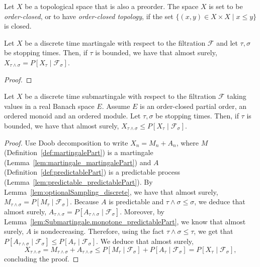 \begin{definition}\label{def:orderClosedTopology}
  \mathlibok
Let $X$ be a topological space that is also a preorder. The space $X$ is set to be \emph{order-closed}, or to have \emph{order-closed topology}, if the set $\{(x, y) \in X \times X \mid x \le y\}$ is closed.
\end{definition}

\begin{lemma}\label{lem:optionalSampling_discrete}
  \mathlibok
  Let $X$ be a discrete time martingale with respect to the filtration $\mathcal{F}$ and let
  $\tau, \sigma$ be stopping times. Then, if $\tau$ is bounded, we have that almost surely,
  $X_{\tau \wedge \sigma} = P[X_{\tau} \mid \mathcal{F}_{\sigma}]$.
\end{lemma}

\begin{proof}
\end{proof}

\begin{lemma}\label{lem:optionalSampling_discrete_submartingale}
  \leanok
Let $X$ be a discrete time submartingale with respect to the filtration $\mathcal{F}$ taking values in a real Banach space $E$. Assume $E$ is an order-closed partial order, an ordered monoid and an ordered module. Let $\tau, \sigma$ be stopping times. Then, if $\tau$ is bounded, we have that almost surely, $X_{\tau \wedge \sigma} \le P[X_{\tau} \mid \mathcal{F}_{\sigma}]$.
\end{lemma}

\begin{proof}
Use Doob decomposition to write $X_n = M_n + A_n$, where $M$ (Definition~\ref{def:martingalePart}) is a martingale (Lemma~\ref{lem:martingale_martingalePart}) and $A$ (Definition~\ref{def:predictablePart}) is a predictable process (Lemma~\ref{lem:predictable_predictablePart}). By Lemma~\ref{lem:optionalSampling_discrete}, we have that almost surely, $M_{\tau \wedge \sigma} = P[M_{\tau} \mid \mathcal{F}_{\sigma}]$. Because $A$ is predictable and $\tau \wedge \sigma \le \sigma$, we deduce that almost surely, $A_{\tau \wedge \sigma} = P[A_{\tau \wedge \sigma} \mid \mathcal{F}_\sigma]$. Moreover, by Lemma~\ref{lem:Submartingale.monotone_predictablePart}, we know that almost surely, $A$ is nondecreasing. Therefore, using the fact $\tau \wedge \sigma \le \tau$, we get that $P[A_{\tau \wedge \sigma} \mid \mathcal{F}_\sigma] \le P[A_\tau \mid \mathcal{F}_\sigma]$. We deduce that almost surely,
$$X_{\tau \wedge \sigma} = M_{\tau \wedge \sigma} + A_{\tau \wedge \sigma} \le P[M_\tau \mid \mathcal{F}_\sigma] + P[A_\tau \mid \mathcal{F}_\sigma] = P[X_\tau \mid \mathcal{F}_\sigma],$$
concluding the proof.
\end{proof}

